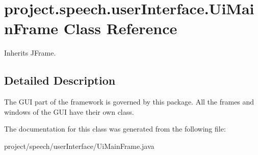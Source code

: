 \section{project.\+speech.\+user\+Interface.\+Ui\+Main\+Frame Class Reference}
\label{classproject_1_1speech_1_1user_interface_1_1_ui_main_frame}


Inherits J\+Frame.



\subsection{Detailed Description}
The G\+U\+I part of the framework is governed by this package. All the frames and windows of the G\+U\+I have their own class. 

The documentation for this class was generated from the following file\+:\begin{DoxyCompactItemize}
\item 
project/speech/user\+Interface/Ui\+Main\+Frame.\+java\end{DoxyCompactItemize}
